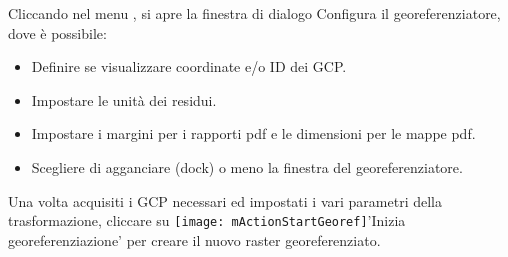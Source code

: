 
Cliccando  nel menu , si apre 
la finestra di dialogo Configura il georeferenziatore, dove è possibile:

\begin{itemize}[label=--]
\item Definire se visualizzare coordinate e/o ID dei GCP.
\item Impostare le unità dei residui.
\item Impostare i margini per i rapporti pdf e le dimensioni per le mappe pdf.
\item Scegliere di agganciare (dock) o meno la finestra del georeferenziatore. 
\end{itemize}

\label{georeferencer_running}

Una volta acquisiti i GCP necessari ed impostati i vari parametri della trasformazione,
cliccare su \texttt{[image: mActionStartGeoref]}{'Inizia georeferenziazione'} 
per creare il nuovo raster georeferenziato.

